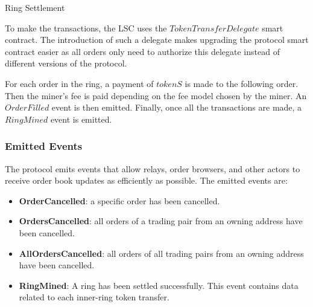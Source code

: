 \documentclass[UTF8,nofonts]{article}
\makeatletter
\newenvironment{figurehere}
 {\def\@captype{figure}}
 {}
\makeatother
\begin{document}
\begin{multicols}{2}
\begin{center}
\begin{figurehere}
\centering
{}
\caption{Ring Settlement}
\label{fig:settlement}
\end{figurehere}
\end{center}

To make the transactions, the LSC uses the $TokenTransferDelegate$ smart contract. The introduction of such a delegate makes upgrading the protocol smart contract easier as all orders only need to authorize this delegate instead of different versions of the protocol.

For each order in the ring, a payment of $tokenS$ is made to the following order. Then the miner's fee is paid depending on the fee model chosen by the miner. An $OrderFilled$ event is then emitted. Finally, once all the transactions are made, a $RingMined$ event is emitted.

\subsubsection{Emitted Events\label{sec:events}}

The protocol emits events that allow relays, order browsers, and other actors to receive order book updates as efficiently as possible. The emitted events are:

\begin{itemize}
	\item \textbf{OrderCancelled}: a specific order has been cancelled.
	\item \textbf{OrdersCancelled}: all orders of a trading pair from an owning address have been cancelled.
	\item \textbf{AllOrdersCancelled}: all orders of all trading pairs from an owning address have been cancelled.
	\item \textbf{RingMined}: A ring has been settled successfully. This event contains data related to each inner-ring token transfer.
\end{itemize}



\end{multicols}
\end{document}
